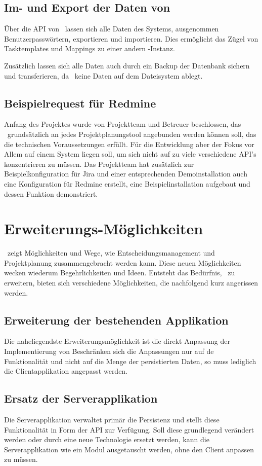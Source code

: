 		
		\subsection{Im- und Export der Daten von \eeppi}
			Über die API von \eeppi\ lassen sich alle Daten des Systems,
			ausgenommen Benutzerpasswörtern, exportieren und importieren.
			Dies ermöglicht das Zügel von Tasktemplates und Mappings zu einer andern \eeppi -Instanz.
			
			Zusätzlich lassen sich alle Daten auch durch ein Backup der Datenbank sichern und transferieren, da \eeppi\ keine Daten auf dem Dateisystem ablegt.
			
			
		\subsection{Beispielrequest für Redmine}
			Anfang des Projektes wurde von Projektteam und Betreuer beschlossen, 
			das \eeppi\ grundsätzlich an jedes Projektplanungstool angebunden werden können soll, das die technischen Voraussetzungen erfüllt.
			Für die Entwicklung aber der Fokus vor Allem auf einem System liegen soll, um sich nicht auf zu viele verschiedene API's konzentrieren zu müssen.
			Das Projektteam hat zusätzlich zur Beispielkonfiguration für Jira und einer entsprechenden Demoinstallation auch eine Konfiguration für Redmine erstellt, eine Beispielinstallation aufgebaut und dessen Funktion demonstriert.
	
	
	\section{Erweiterungs-Möglichkeiten}
		\eeppi\ zeigt Möglichkeiten und Wege, wie Entscheidungsmanagement und Projektplanung zusammengebracht werden kann.
		Diese neuen Möglichkeiten wecken wiederum Begehrlichkeiten und Ideen.
		Entsteht das Bedürfnis, \eeppi\ zu erweitern, bieten sich verschiedene Möglichkeiten, die nachfolgend kurz angerissen werden.
		

		\subsection{Erweiterung der bestehenden Applikation}
			Die naheliegendste Erweiterungsmöglichkeit ist die direkt Anpassung der Implementierung von \eeppi\.
			Beschränken sich die Anpassungen nur auf de Funktionalität und nicht auf die Menge der persistierten Daten, so muss lediglich die Clientapplikation angepasst werden.
	
		\subsection{Ersatz der Serverapplikation}
			Die Serverapplikation verwaltet primär die Persistenz und stellt diese Funktionalität in Form der API zur Verfügung.
			Soll diese grundlegend verändert werden oder durch eine neue Technologie ersetzt werden,
			kann die Serverapplikation wie ein Modul ausgetauscht werden, ohne den Client anpassen zu müssen.
			
